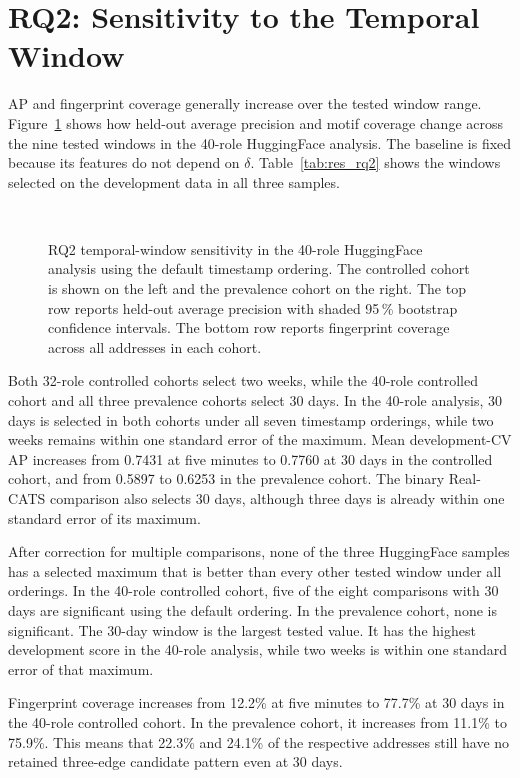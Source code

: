 \section{RQ2: Sensitivity to the Temporal Window}

AP and fingerprint coverage generally increase over the tested window range.
Figure~\ref{fig:res_rq2_delta} shows how held-out
average precision and motif coverage change across the nine tested windows in
the 40-role HuggingFace analysis. The baseline is fixed because its features do
not depend on $\delta$. Table~\ref{tab:res_rq2} shows the windows selected on the
development data in all three samples.

\begin{figure}[p]
  \centering
  \\[4pt]
  \caption{RQ2 temporal-window sensitivity in the 40-role HuggingFace analysis
  using the default timestamp ordering. The controlled cohort is shown on the
  left and the prevalence cohort on the right. The top row reports held-out
  average precision with shaded 95\,\% bootstrap confidence intervals.
  The bottom row reports fingerprint coverage across all addresses
  in each cohort.}
  \label{fig:res_rq2_delta}
\end{figure}


Both 32-role controlled cohorts select two weeks, while the 40-role controlled
cohort and all three prevalence cohorts select 30 days. In the 40-role analysis,
30 days is selected in both cohorts under all seven timestamp
orderings, while two weeks remains within one standard error of the maximum.
Mean development-CV AP increases from 0.7431 at five minutes to 0.7760 at 30
days in the controlled cohort, and from 0.5897 to 0.6253 in the prevalence
cohort. The binary Real-CATS comparison also selects 30 days, although three
days is already within one standard error of its maximum.

After correction for multiple comparisons, none of the three HuggingFace
samples has a selected maximum that is better than every other tested window
under all orderings. In the 40-role controlled cohort, five of the eight
comparisons with 30 days are significant using the default ordering. In the
prevalence cohort, none is significant. The 30-day window is the largest tested
value. It has the highest development score in the 40-role analysis, while
two weeks is within one standard error of that maximum.

Fingerprint coverage increases from 12.2\% at five minutes to 77.7\% at 30 days in
the 40-role controlled cohort. In the prevalence cohort, it increases
from 11.1\% to 75.9\%. This means that 22.3\% and 24.1\% of the respective addresses still
have no retained three-edge candidate pattern even at 30 days.

